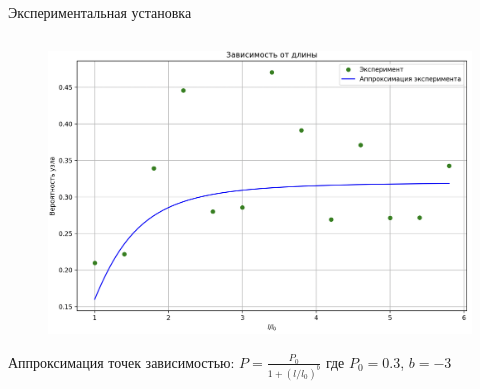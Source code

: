 \begin{frame}{Экспериментальная установка}
\begin{columns}
\begin{column}{0.6\linewidth}
			\begin{figure}[H]
				\includegraphics[width=1\linewidth]{img/exp_4.png}
			\end{figure}
			Аппроксимация точек зависимостью:
			$P = \frac{P_0}{1+(l/l_0)^b}$
			где $P_0 = 0.3$, $b = -3$

		\end{column}

	\end{columns}

%
%
%
%
%
%

\end{frame}

